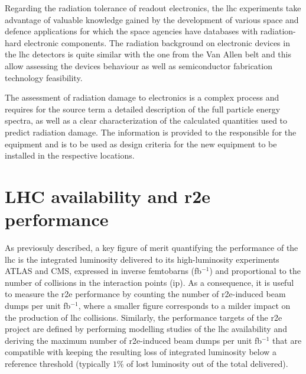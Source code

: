 \documentclass[encoding=utf8,british]{tumphthesis}
\begin{document}
Regarding the radiation tolerance of readout electronics, the \acrshort{lhc} experiments take advantage of valuable knowledge gained by the development of various space and defence applications for which the space agencies have databases with radiation-hard electronic components. The radiation background on electronic devices in the \acrshort{lhc} detectors is quite similar with the one from the Van Allen belt and this allow assessing the devices behaviour as well as semiconductor fabrication technology feasibility. \cite{GarcíaAlía:2012360}

The assessment of radiation damage to electronics is a complex process and requires for the source term a detailed description of the full particle energy spectra, as well as a clear characterization of the calculated quantities used to predict radiation damage.  The information is provided to the responsible for the equipment and is to be used as design criteria for the new equipment to be installed in the respective locations.
\cite{FLUKA-Capabilities-and-CERN-Applications-for-the-Study-of-Radiation-Damage-to-Electronics-at-High-Energy-Hadron-Accelerators}

\section{LHC availability and \acrshort{r2e} performance}

As previosuly described, a key figure of merit quantifying the performance of the \acrshort{lhc} is the integrated luminosity delivered to its high-luminosity experiments ATLAS and CMS, expressed in inverse femtobarns (fb$^{-1}$) and proportional to the number of collisions in the interaction points (\acrshort{ip}). As a consequence, it is useful to measure the \acrshort{r2e} performance by counting the number of \acrshort{r2e}-induced beam dumps per unit fb$^{-1}$, where a smaller figure corresponds to a milder impact on the production of \acrshort{lhc} collisions. Similarly, the performance targets of the \acrshort{r2e} project are defined by performing modelling studies of the \acrshort{lhc} availability \cite{apollonio2017lessons} and deriving the maximum number of \acrshort{r2e}-induced beam dumps per unit fb$^{-1}$ that are compatible with keeping the resulting loss of integrated luminosity below a reference threshold (typically $1\%$ of lost luminosity out of the total delivered).
\end{document}
